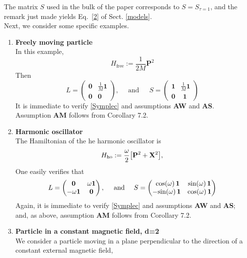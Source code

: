 \documentclass[12pt]{article}
\begin{document}
The matrix $S$ used in the bulk of the paper corresponds to $S=S_{\tau=1}$, and the remark just made yields Eq.~\eqref{2} of Sect. \ref{models}.\\

Next, we consider some specific examples.

\begin{enumerate}
	\item{{\bf{Freely moving particle}} \\
		In this example,
		\begin{equation}\label{freeham}
		H_{\text{free}}:= \frac{1}{2M} \mathbf{P}^{2}
		\end{equation}
		Then 
		$$L=\begin{pmatrix} \mathbf{0}& \frac{1}{M}\mathbf{1}\\ \mathbf{0} & \mathbf{0}\end{pmatrix}, \quad \text{ and  }\,\quad 
		S=\begin{pmatrix} \mathbf{1} & \frac{1}{M} \mathbf{1}\\ \mathbf{0} & \,\,\mathbf{1} \end{pmatrix} $$
		It is immediate to verify \eqref{Symplec} and assumptions {\bf{AW}} and {\bf{AS}}. Assumption {\bf{AM}} follows from Corollary 7.2.
	}
	\item{ {\bf{Harmonic oscillator}} \\
		The Hamiltonian of the he harmonic oscillator is 
		\begin{align}\label{osci}
		H_{{\rm ho}} :=  \frac{\omega}{2}\big[\mathbf P^2 +  \mathbf X^2\big],
		\end{align}
		One easily verifies that 
		$$L=\begin{pmatrix} {\bf{0}} & \omega \mathbf{1}\\ -\omega \mathbf{1} & \mathbf{0}\end{pmatrix}, \quad \text{  and }\quad 
		S=\begin{pmatrix} \,\, \text{cos}(\omega)\, \mathbf{1} &\text{sin}(\omega)\, \mathbf{1}\\- \text{sin}(\omega)\, \mathbf{1} & 
		\text{cos}(\omega)\, \mathbf{1} \end{pmatrix} $$
		Again, it is immediate to verify \eqref{Symplec} and assumptions {\bf{AW}} and {\bf{AS}}; and, as above, assumption {\bf{AM}} follows from Corollary 7.2.
	}
	\item{\bf{ Particle in a constant magnetic field, d=2}}\\
		We consider a particle moving in a plane perpendicular to the direction of a constant external magnetic field, 

\end{enumerate}
\end{document}
